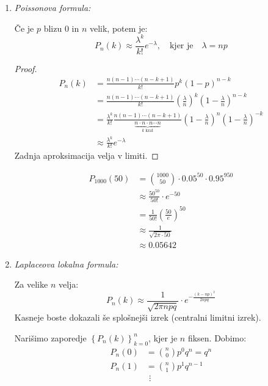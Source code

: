 \documentclass[12pt]{book}
\theoremstyle{definition}
\theoremstyle{plain}
\theoremstyle{plain}
\theoremstyle{plain}
\theoremstyle{remark}
\begin{document}
\begin{enumerate}[label=(\alph*)]
    \item \emph{Poissonova formula:}
    
    Če je $p$ blizu $0$ in $n$ velik, potem je: 
    $$
    P_n(k) \approx \frac{\lambda^k}{k !} e^{-\lambda}, \quad \text{kjer je} \quad \lambda = n p
    $$
    \begin{proof}
        $$
        \begin{aligned}
            P_n(k)&=\frac{n(n-1) \cdots (n-k+1)}{k !} p^k (1-p)^{n-k} \\
            &=\frac{n(n-1) \cdots(n-k+1)}{k !}\left(\frac{\lambda}{n}\right)^k \left(1-\frac{\lambda}{n}\right)^{n-k} \\
            &=\frac{\lambda^k}{k !} \frac{n(n-1)\cdots(n-k+1)}{\underbrace{n \cdot n \cdot n \cdots n}_{k \text{ krat}}} \left(1-\frac{\lambda}{n}\right)^n \left(1-\frac{\lambda}{n}\right)^{-k} \\
            &\approx \frac{\lambda^k}{k !} e^{-\lambda}
        \end{aligned}
        $$
        Zadnja aproksimacija velja v limiti. 
    \end{proof}
    \begin{zgled}
        $$
        \begin{aligned}
            P_{1000}(50) &= \binom{1000}{50}\cdot 0.05^{50} \cdot 0.95^{950} \\
            &\approx \frac{50^{50}}{50 !} \cdot e^{-50} \\
            &= \frac{1}{50 !}\left(\frac{50}{e}\right)^{50} \\
            &\approx \frac{1}{\sqrt{2 \pi \cdot 50}} \\
            &\approx 0.05642
        \end{aligned}
        $$
    \end{zgled}
    \item \emph{Laplaceova lokalna formula:}
    
    Za velike $n$ velja: 
    $$
    P_n(k) \approx \frac{1}{\sqrt{2 \pi n  p q}} \cdot e^{-\frac{\left(k-np\right)^2}{2 n p q}}
    $$
    Kasneje boste dokazali še splošnejši izrek (centralni limitni izrek).

    Narišimo zaporedje $\left\{P_n(k)\right\}_{k=0}^n$, kjer je $n$ fiksen. Dobimo: 
    $$
    \begin{aligned}
        P_n(0)&=\binom{n}{0} p^0 q^n=q^n \\
        P_n(1)&=\binom{n}{1} p^1 q^{n-1} \\
        & \ \, \vdots
    \end{aligned}
    $$
    

\end{enumerate}
\end{document}
